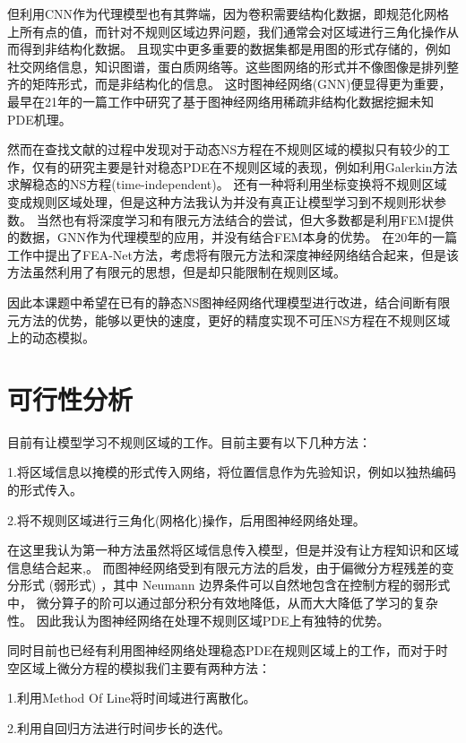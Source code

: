但利用CNN作为代理模型也有其弊端，因为卷积需要结构化数据，即规范化网格上所有点的值，而针对不规则区域边界问题，我们通常会对区域进行三角化操作从而得到非结构化数据。
且现实中更多重要的数据集都是用图的形式存储的，例如社交网络信息，知识图谱，蛋白质网络等。这些图网络的形式并不像图像是排列整齐的矩阵形式，而是非结构化的信息。
这时图神经网络(GNN)便显得更为重要，最早在21年的一篇工作中研究了基于图神经网络用稀疏非结构化数据挖掘未知PDE机理\cite{learnpdefrom_gnn}。

然而在查找文献的过程中发现对于动态NS方程在不规则区域的模拟只有较少的工作，仅有的研究主要是针对稳态PDE在不规则区域的表现，例如利用Galerkin方法求解稳态的NS方程(time-independent)\cite{GAO2022114502}。
还有一种将利用坐标变换将不规则区域变成规则区域处理\cite{gao_phygeonet:_2020}，但是这种方法我认为并没有真正让模型学习到不规则形状参数。
当然也有将深度学习和有限元方法结合的尝试\cite{https://doi.org/10.1002/pamm.202200306}\cite{pmlr-v119-de-avila-belbute-peres20a}，但大多数都是利用FEM提供的数据，GNN作为代理模型的应用，并没有结合FEM本身的优势。
在20年的一篇工作中提出了FEA-Net\cite{YAO2020112892}方法，考虑将有限元方法和深度神经网络结合起来，但是该方法虽然利用了有限元的思想，但是却只能限制在规则区域。

因此本课题中希望在已有的静态NS图神经网络代理模型进行改进，结合间断有限元方法的优势，能够以更快的速度，更好的精度实现不可压NS方程在不规则区域上的动态模拟。


\section{可行性分析}
目前有让模型学习不规则区域的工作。目前主要有以下几种方法：

1.将区域信息以掩模的形式传入网络，将位置信息作为先验知识，例如以独热编码的形式传入。

2.将不规则区域进行三角化(网格化)操作，后用图神经网络处理。

在这里我认为第一种方法虽然将区域信息传入模型，但是并没有让方程知识和区域信息结合起来,。
而图神经网络受到有限元方法的启发，由于偏微分方程残差的变分形式 (弱形式) ，其中 Neumann 边界条件可以自然地包含在控制方程的弱形式中，
微分算子的阶可以通过部分积分有效地降低，从而大大降低了学习的复杂性。
因此我认为图神经网络在处理不规则区域PDE上有独特的优势。

同时目前也已经有利用图神经网络处理稳态PDE在规则区域上的工作，而对于时空区域上微分方程的模拟我们主要有两种方法：

1.利用Method Of Line将时间域进行离散化。

2.利用自回归方法进行时间步长的迭代。


